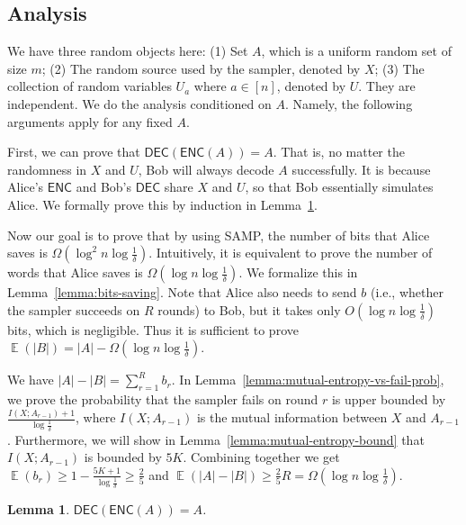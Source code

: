 \documentclass[10pt]{article}
\newtheorem{lemma}{Lemma}
\DeclareMathOperator*{\E}{\mathbb{E}}
\newcommand{\samp}{\textsf{SAMP}\xspace}
\newcommand{\enc}{\textsf{ENC}\xspace}
\newcommand{\dec}{\textsf{DEC}\xspace}
\begin{document}
\subsection{Analysis}

We have three random objects here: (1) Set $A$, which is a uniform random set of size $m$; (2) The random source used by the sampler, denoted by $X$; (3) The collection of random variables $U_a$ where $a\in [n]$, denoted by $U$. They are independent. We do the analysis conditioned on $A$. Namely, the following arguments apply for any fixed $A$. 

First, we can prove that $\dec(\enc(A))=A$. That is, no matter the randomness in $X$ and $U$, Bob will always decode $A$ successfully. It is because Alice's $\enc$ and Bob's $\dec$ share $X$ and $U$, so that Bob essentially simulates Alice. We formally prove this by induction in Lemma~\ref{lemma:zero-fail-prob}. 

Now our goal is to prove that by using \samp, the number of bits that Alice saves is $\Omega(\log^2 n \log\frac{1}{\delta})$. Intuitively, it is equivalent to prove the number of words that Alice saves is $\Omega(\log n \log\frac{1}{\delta})$.
We formalize this in Lemma~\ref{lemma:bits-saving}. Note that Alice also needs to send $b$ (i.e., whether the sampler succeeds on $R$ rounds) to Bob, but it takes only $O(\log n \log\frac{1}{\delta})$ bits, which is negligible. Thus it is sufficient to prove $\E(|B|)=|A|-\Omega(\log n \log\frac{1}{\delta})$. 

We have $|A|-|B|=\sum_{r=1}^{R}b_r$. 
In Lemma~\ref{lemma:mutual-entropy-vs-fail-prob}, we prove the probability that the sampler fails on round $r$ is upper bounded by $\frac{I(X;A_{r-1})+1}{\log \frac{1}{\delta}}$, where $I(X;A_{r-1})$ is the mutual information between $X$ and $A_{r-1}$. 
Furthermore, we will show in Lemma~\ref{lemma:mutual-entropy-bound} that $I(X;A_{r-1})$ is bounded by $5K$.
Combining together we get $\E(b_r)\ge 1-\frac{5K+1}{\log \frac{1}{\delta}}\ge \frac{2}{5}$ and $\E(|A|-|B|)\ge \frac{2}{5}R=\Omega(\log n \log\frac{1}{\delta})$. 

\begin{lemma}\label{lemma:zero-fail-prob}
  $\dec(\enc(A))=A$.
\end{lemma}
\end{document}

